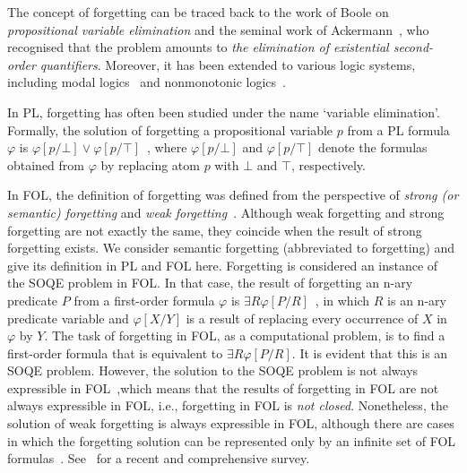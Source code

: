 \documentclass[sn-mathphys]{sn-jnl}%
\theoremstyle{thmstyleone}%
\theoremstyle{thmstyletwo}%
\theoremstyle{thmstylethree}%
\begin{document}
The concept of forgetting can be traced back to the work of Boole on \emph{propositional
	variable elimination} and the seminal work of Ackermann~\cite{ackermann1935untersuchungen}, who recognised that the problem amounts to \emph{the elimination of existential second-order quantifiers}.
Moreover, it has been extended  to various logic systems, including modal logics~\cite{Yan:AIJ:2009,fang2019forgetting} and nonmonotonic logics~\cite{DBLP:journals/jair/WangZZZ14,gonccalves2020limits}.



In PL, forgetting has often been studied under the name `variable
elimination'. Formally, the solution of forgetting a propositional variable $p$ from a PL formula $\varphi$ is $\varphi[p/\bot] \vee \varphi[p/\top]$~\cite{Fangzhen:forgetit}, where $\varphi[p/\bot]$ and $\varphi[p/\top]$ denote the formulas obtained from $\varphi$ by replacing atom $p$ with $\bot$ and $\top$, respectively.


In FOL, the definition of forgetting was defined from the perspective of \emph{strong (or semantic) forgetting} and \emph{weak forgetting}~\cite{Zhang:KR:2010}.
Although  weak forgetting and strong forgetting are not exactly the same, they coincide when the result of strong forgetting exists.
We consider semantic forgetting (abbreviated to forgetting) and give its definition in PL and FOL here.
Forgetting is considered an instance of the SOQE problem in FOL. In that case, the result of forgetting an n-ary predicate $P$ from a first-order formula $\varphi$ is $\exists R \varphi[P/R]$~\cite{Fangzhen:forgetit}, in which $R$ is an n-ary predicate variable and $\varphi[X/Y]$ is a result of replacing every occurrence of $X$ in $\varphi$ by $Y$. The task of forgetting in FOL, as a computational problem, is to find a first-order formula that is equivalent to $\exists R \varphi[P/R]$. It is evident that this is an SOQE problem. However, the solution to the SOQE problem is not always expressible in FOL~\cite{gabbay2008second},which means that the results of forgetting in FOL are not always expressible in FOL, i.e., forgetting in FOL is \emph{not closed}.
Nonetheless, the solution of weak forgetting is always expressible in FOL, although
there are cases in which the forgetting solution can be represented only by an infinite set of
FOL formulas~\cite{Zhang:KR:2010}. %
See~\cite{eiter2019brief} for a recent and comprehensive survey.
\end{document}
